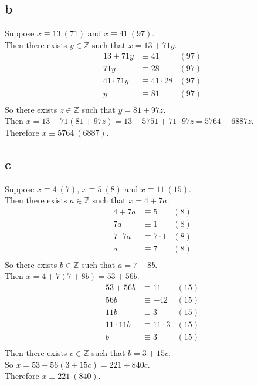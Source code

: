 \documentclass[letterpaper,12pt,oneside,onecolumn]{report}
\begin{document}
\subsection*{b}
Suppose $x \equiv 13\ (71)$ and $x \equiv 41\ (97)$.\\
Then there exists $y \in \mathbb{Z}$ such that $x = 13 + 71y$.
\begin{align*}
13 + 71y &\equiv 41 &(97)\\
71y &\equiv 28 &(97)\\
41 \cdot 71y &\equiv 41 \cdot 28 &(97)\\
y &\equiv 81 &(97)\\
\end{align*}
So there exists $z \in \mathbb{Z}$ such that $y = 81 + 97z$.\\
Then $x = 13 + 71(81 + 97z) = 13 + 5751 + 71\cdot97z = 5764 + 6887z$.\\
Therefore $ x \equiv 5764\ (6887)$.
\subsection*{c}
Suppose $x \equiv 4\ (7)$, $x \equiv 5\ (8)$ and $x \equiv 11\ (15)$.\\
Then there exists $a \in \mathbb{Z}$ such that $x = 4 + 7a$.\\
\begin{align*}
4 + 7a &\equiv 5 &(8)\\
7a &\equiv 1 &(8)\\
7\cdot7a &\equiv 7\cdot1 &(8)\\
a &\equiv 7 &(8)\\
\end{align*}
So there exists $b \in \mathbb{Z}$ such that $a = 7 + 8b$.\\
Then $x = 4 + 7(7 + 8b) = 53 + 56b$.\\
\begin{align*}
53 + 56b &\equiv 11 &(15)\\
56b &\equiv -42 &(15)\\
11b &\equiv 3 &(15)\\
11\cdot11b &\equiv 11\cdot3 &(15)\\
b &\equiv 3 &(15)\\
\end{align*}
Then there exists $c \in \mathbb{Z}$ such that $b = 3 + 15c$.\\
So $x = 53 + 56(3 + 15c) = 221 + 840c$.\\
Therefore $x \equiv 221\ (840)$.\\
\end{document}
